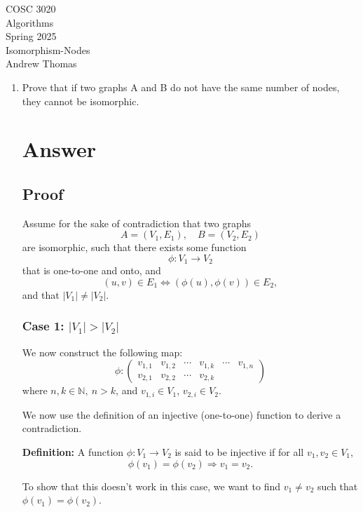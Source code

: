 \documentclass{amsart}
\theoremstyle{definition}
\begin{document}
\begin{center}
	{\bgbf COSC 3020\\ \smallskip
	Algorithms\\ \smallskip
	Spring 2025\\ \smallskip
	Isomorphism-Nodes\\ \smallskip
        Andrew Thomas}
\end{center}
\smallskip

\begin{enumerate}
	\item Prove that if two graphs 
A
 and 
B
 do not have the same number of nodes, they cannot be isomorphic.

\section*{Answer}

\subsection*{Proof}

Assume for the sake of contradiction that two graphs 
\[ A=(V_1,E_1), \quad B=(V_2,E_2) \]
are isomorphic, such that there exists some function 
\[
\phi: V_1 \longrightarrow V_2
\]
that is one-to-one and onto, and 
\[
(u,v) \in E_1 \iff (\phi(u), \phi(v)) \in E_2,
\]
and that \(|V_1| \ne |V_2|\).

\subsubsection*{Case 1: \(|V_1| > |V_2|\)}

We now construct the following map:
\[
\phi:
\begin{pmatrix}
v_{1,1} & v_{1,2} & \cdots & v_{1,k} & \cdots & v_{1,n} \\
v_{2,1} & v_{2,2} & \cdots & v_{2,k}
\end{pmatrix}
\]
where \(n, k \in \mathbb{N},\ n > k\), and \(v_{1,i} \in V_1\), \(v_{2,i} \in V_2\).

We now use the definition of an injective (one-to-one) function to derive a contradiction.

\textbf{Definition:} A function \(\phi: V_1 \rightarrow V_2\) is said to be injective if for all \(v_1, v_2 \in V_1\),
\[
\phi(v_1) = \phi(v_2) \Rightarrow v_1 = v_2.
\]

To show that this doesn't work in this case, we want to find \(v_1 \ne v_2\) such that \(\phi(v_1) = \phi(v_2)\).\par


\end{enumerate}
\end{document}
